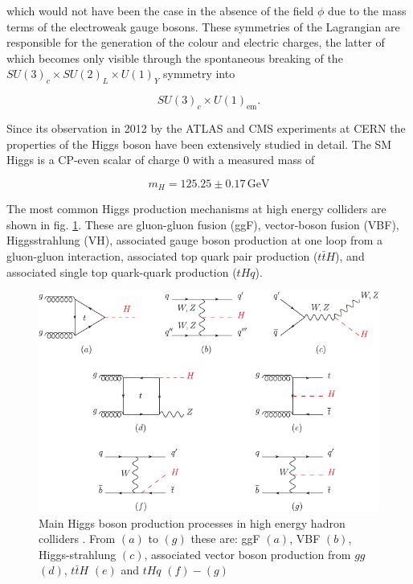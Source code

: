 which would not have been the case in the absence of the field $\phi$ due to the mass terms of the electroweak gauge bosons. These symmetries of the Lagrangian are responsible for the generation of the colour and electric charges, the latter of which becomes only visible through the spontaneous breaking of the $SU(3)_c \times SU(2)_L \times U(1)_Y$ symmetry into

\begin{equation*}
	SU(3)_c \times U(1)_\text{em}.
\end{equation*}

Since its observation in 2012 by the ATLAS and CMS experiments at CERN \cite{Chatrchyan_2012} the properties of the Higgs boson have been extensively studied in detail. The SM Higgs is a CP-even scalar of charge 0 with a measured mass of

\begin{equation*}
	m_H = 125.25 \pm 0.17 \, \text{GeV}
\end{equation*}

The most common Higgs production mechanisms at high energy colliders are shown in fig. \ref{fig:higgsproduction}. These are gluon-gluon fusion (ggF), vector-boson fusion (VBF), Higgsstrahlung (VH), associated gauge boson production at one loop from a gluon-gluon interaction, associated top quark pair production ($t\bar{t}H$), and associated single top quark-quark production ($tHq$).

\begin{figure}[h!]
	\centering
	\includegraphics[width=0.8\linewidth]{figures/theory/higgsproduction.pdf}
	\caption{Main Higgs boson production processes in high energy hadron colliders \cite{Workman:2022ynf}. From $(a)$ to $(g)$ these are: ggF $(a)$, VBF $(b)$, Higgs-strahlung $(c)$, associated vector boson production from $gg$ $(d)$, $t\bar{t}H$ $(e)$ and $tHq$ $(f)-(g)$ \cite{Workman:2022ynf}}
	\label{fig:higgsproduction}
\end{figure}

